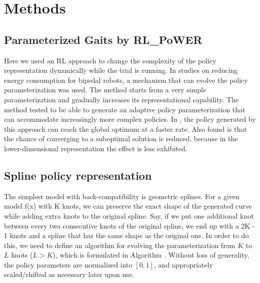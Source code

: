 \section{Methods}



\subsection{Parameterized Gaits by RL\_PoWER}

Here we used an RL approach to change the complexity of the policy
representation dynamically while the trial is running. In
\cite{kormushev2011bipedal-walking-energya} studies on reducing energy
consumption for bipedal robots, a mechanism that can
evolve the policy parameterization was used. The method starts from a
very simple parameterization and gradually increases its
representational capability. The method tested to be able to generate
an adaptive policy parameterization that can accommodate increasingly
more complex policies. In \cite{kormushev2011bipedal-walking-energya}, the policy
generated by this approach can reach the global optimum at a faster
rate. Also found is that the chance of converging to a suboptimal
solution is reduced, because in the lower-dimensional representation
the effect is less exhibited.



\subsection{Spline policy representation}

The simplest model with back-compatibility is geometric
splines. For a given model f(x) with K knots, we can preserve the
exact shape of the generated curve while adding extra knots to the
original spline. Say, if we put one additional knot between every two
consecutive knots of the original spline, we end up with a 2K - 1
knots and a spline that has the same shape as the original one. In
order to do this, we need to define an algorithm for evolving the
parameterization from $K$ to $L$ knots ($L > K$), which is formulated in
Algorithm .  Without loss of generality, the policy parameters are
normalized into $[0, 1]$, and appropriately scaled/shifted as necessary
later upon use.


